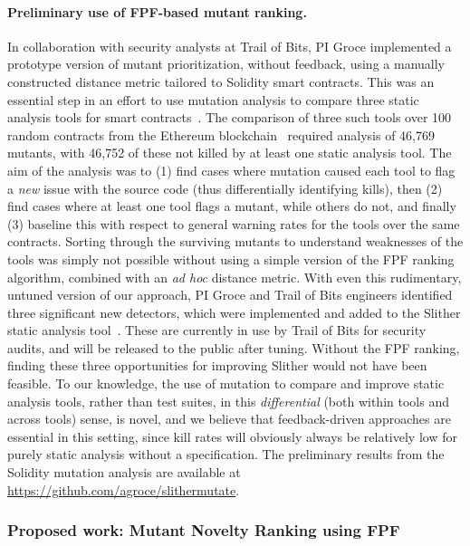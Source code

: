 \paragraph{Preliminary use of FPF-based mutant ranking.} In collaboration with security analysts at Trail of Bits, PI Groce
implemented a prototype version of mutant prioritization, without
feedback, using a manually constructed distance metric tailored to
Solidity smart contracts.  This was an essential step in an effort to
use mutation analysis to compare three static analysis tools for smart
contracts~\cite{slitherpaper,sc:smartcheck,securify}.  The comparison of three such tools over 100 random contracts
from the Ethereum blockchain~\cite{buterin2013whitepaper,wood2014yellow} required analysis of 46,769 mutants, with
46,752 of these not killed by at least one static analysis tool.  The
aim of the analysis was to (1) find cases where mutation caused each
tool to flag a \emph{new} issue with the source code (thus
differentially identifying kills), then (2) find cases where at
least one tool flags a mutant, while others do not, and finally (3) baseline
this with respect to general warning rates for the tools over the same contracts.
Sorting through the surviving mutants to understand weaknesses of the
tools was simply not possible without using a simple version of the
FPF ranking algorithm, combined with an \emph{ad hoc} distance
metric.  With even this rudimentary, untuned version of our approach,
PI Groce and Trail of Bits engineers identified three significant new
detectors, which were implemented and added to the Slither static
analysis tool~\cite{slitherpaper}.  These are currently in use by Trail of Bits for
security audits, and will be released to the public after tuning.  Without the FPF ranking, finding these three
opportunities for improving Slither would not have been feasible.  To
our knowledge, the use of mutation to compare and improve static
analysis tools, rather than test suites, in this \emph{differential}
(both within tools and across tools) sense, is novel, and we believe that
feedback-driven approaches are essential in this setting, since kill
rates will obviously always be relatively low for purely static
analysis without a specification.  The preliminary results from the
Solidity mutation analysis are available at
\url{https://github.com/agroce/slithermutate}.

\subsubsection{Proposed work: Mutant Novelty Ranking using FPF}

